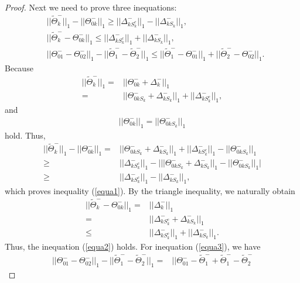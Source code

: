 \documentclass[review]{elsarticle}
\newcommand{\1}{{\bf 1}}
\newcommand{\0}{{\bf 0}}
\newcommand{\bqa}{\begin{eqnarray}}
\newcommand{\eqa}{\end{eqnarray}}
\newtheorem{proof}{Proof}
\begin{document}
\begin{appendices}
\begin{proof}
 Next we need to prove three inequations:
\bqa\label{equa1}
&||\widetilde{\Theta}_k^{-}||_1-||\Theta_{0k}^{-}||_1 \geq ||\Delta_{kS_k^{c}}^{-}||_1-||\Delta_{kS_k}^{-}||_1,\\ \label{equa2}
&||\widetilde{\Theta}_k^{-}-\Theta_{0k}^{-}||_1\leq
||\Delta_{kS_k^{c}}^{-}||_1+||\Delta_{kS_k}^{-}||_1,\\ \label{equa3}
&||\Theta_{01}^{-}-\Theta_{02}^{-}||_1-
||\widetilde{\Theta}_1^{-}-\widetilde{\Theta}_2^{-}||_1\leq
||\widetilde{\Theta}_1^{-}-\Theta_{01}^{-}||_1+||\widetilde{\Theta}_2^{-}
-\Theta_{02}^{-}||_1.
\eqa
 Because
\begin{equation}
\begin{split}
||\widetilde{\Theta}_k^{-}||_1=&||{\Theta}_{0k}^{-}+\Delta_k^{-}||_1\\
=&||{\Theta}_{0kS_{k}}^{-}+\Delta_{kS_k}^{-}||_1+||\Delta_{kS_k^c}^{-}||_1,
\end{split}
\end{equation}
 and
\bqa
||{\Theta}_{0k}^{-}||_1=||{\Theta}_{0kS_{k}}^{-}||_1
\eqa
 hold. Thus,
\begin{equation}
\begin{split}
||\widetilde{\Theta}_k^{-}||_1-||{\Theta}_{0k}^{-}||_1
=&||{\Theta}_{0kS_{k}}^{-}
+\Delta_{kS_k}^{-}||_1+||\Delta_{kS_k^c}^{-}||_1-||{\Theta}_{0kS_{k}}^{-}||_1\\
\geq&||\Delta_{kS_k^c}^{-}||_1-\Big|||{\Theta}_{0kS_{k}}^{-}
+\Delta_{kS_k}^{-}||_1-||{\Theta}_{0kS_{k}}^{-}||_1\Big|\\
\geq&||\Delta_{kS_k^c}^{-}||_1-||\Delta_{kS_k}^{-}||_1,
\end{split}
\end{equation}
 which proves inequality (\ref{equa1}).
 By the triangle inequality, we naturally obtain
\begin{equation}
\begin{split}
||\widetilde{\Theta}_k^{-}-\Theta_{0k}^{-}||_1=&||\Delta_k^{-}||_1\\
=&||\Delta_{kS_k^{c}}^{-}+\Delta_{kS_k}^{-}||_1\\
\leq& ||\Delta_{kS_k^{c}}^{-}||_1+||\Delta_{kS_k}^{-}||_1.
\end{split}
\end{equation}
 Thus, the inequation (\ref{equa2}) holds.
 For inequation (\ref{equa3}), we have
\begin{equation}
\begin{split}
||\Theta_{01}^{-}-\Theta_{02}^{-}||_1-||\widetilde{\Theta}_1^{-}-\widetilde{\Theta}_2^{-}||_1
=&||\Theta_{01}^{-}-\widetilde{\Theta}_1^{-}+\widetilde{\Theta}_1^{-}-\widetilde{\Theta}_2^{-}

\end{split}
\end{equation}
\end{proof}
\end{appendices}
\end{document}
